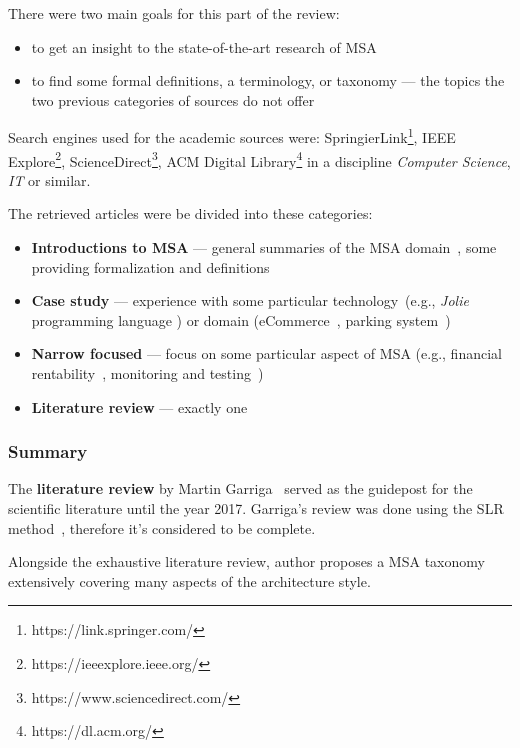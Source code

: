 \documentclass[thesis=M,english,hidelinks]{FITthesis}[2012/10/20]
\begin{document}
There were two main goals for this part of the review:
\begin{itemize}
    \item to get an insight to the state-of-the-art research of \acrshort{MSA}
    \item to find some formal definitions, a terminology, or taxonomy --- the topics the two previous categories of sources do not offer
\end{itemize}

Search engines used for the academic sources were: SpringierLink\footnote{https://link.springer.com/}, IEEE Explore\footnote{https://ieeexplore.ieee.org/},  ScienceDirect\footnote{https://www.sciencedirect.com/}, ACM Digital Library\footnote{https://dl.acm.org/} in a discipline \textit{Computer Science}, \textit{IT} or similar.

The retrieved articles were be divided into these categories:
\begin{itemize}
    \item \textbf{Introductions to MSA} --- general summaries of the \acrshort{MSA} domain~\cite{ms-sc-collaborative-mdd, ms-sc-Schwartz2017, ms-sc-Gruhn2018}, some providing formalization and definitions~\cite{ms-today-tomorrow}
    \item \textbf{Case study} --- experience with some particular technology~(e.g., \textit{Jolie} programming language \cite{ms-sc-Guidi2017}) or domain (eCommerce~\cite{ms-sc-ecommerce}, parking system~\cite{ms-sc-parking})
    \item \textbf{Narrow focused} --- focus on some particular aspect of \acrshort{MSA} (e.g., financial rentability~\cite{ms-sc-economics}, monitoring and testing~\cite{ms-sc-visualization})
    \item \textbf{Literature review} --- exactly one~\cite{ms-taxonomy}
\end{itemize}

\subsubsection*{Summary}
The \textbf{literature review} by Martin Garriga~\cite{ms-taxonomy} served as the guidepost for the scientific literature until the year 2017. Garriga's review was done using the \acrfull{SLR} method~\cite{slr-guidelines}, therefore it's considered to be complete.

Alongside the exhaustive literature review, author proposes a \acrshort{MSA} taxonomy extensively covering many aspects of the architecture style.
\end{document}
